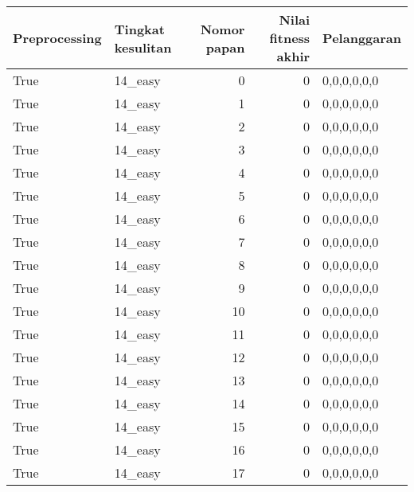 \begin{tabular}{llrrl}
\hline
 Preprocessing   & Tingkat kesulitan   &   Nomor papan &   Nilai fitness akhir & Pelanggaran   \\
\hline
 True            & 14\_easy             &             0 &                     0 & 0,0,0,0,0,0   \\
 True            & 14\_easy             &             1 &                     0 & 0,0,0,0,0,0   \\
 True            & 14\_easy             &             2 &                     0 & 0,0,0,0,0,0   \\
 True            & 14\_easy             &             3 &                     0 & 0,0,0,0,0,0   \\
 True            & 14\_easy             &             4 &                     0 & 0,0,0,0,0,0   \\
 True            & 14\_easy             &             5 &                     0 & 0,0,0,0,0,0   \\
 True            & 14\_easy             &             6 &                     0 & 0,0,0,0,0,0   \\
 True            & 14\_easy             &             7 &                     0 & 0,0,0,0,0,0   \\
 True            & 14\_easy             &             8 &                     0 & 0,0,0,0,0,0   \\
 True            & 14\_easy             &             9 &                     0 & 0,0,0,0,0,0   \\
 True            & 14\_easy             &            10 &                     0 & 0,0,0,0,0,0   \\
 True            & 14\_easy             &            11 &                     0 & 0,0,0,0,0,0   \\
 True            & 14\_easy             &            12 &                     0 & 0,0,0,0,0,0   \\
 True            & 14\_easy             &            13 &                     0 & 0,0,0,0,0,0   \\
 True            & 14\_easy             &            14 &                     0 & 0,0,0,0,0,0   \\
 True            & 14\_easy             &            15 &                     0 & 0,0,0,0,0,0   \\
 True            & 14\_easy             &            16 &                     0 & 0,0,0,0,0,0   \\
 True            & 14\_easy             &            17 &                     0 & 0,0,0,0,0,0   \\

\end{tabular}
